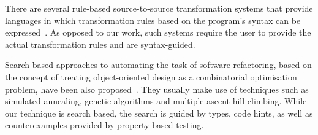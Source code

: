 \documentclass[sigconf,review,anonymous]{acmart}
\begin{document}





There are several rule-based source-to-source transformation systems that provide languages in which
transformation rules based on the program's syntax can be expressed~\cite{stratego,txl}. 
As opposed to our work, such systems require the user to provide the actual transformation rules and are syntax-guided.


Search-based approaches to automating the task of software refactoring, based
on the concept of treating object-oriented design as a combinatorial optimisation
problem, have been also proposed~\cite{search1,search2}. They usually make use of techniques such as
simulated annealing, genetic algorithms and multiple ascent hill-climbing.
While our technique is search based, the search is guided by types, code hints, as well as counterexamples
provided by property-based testing.
\end{document}
